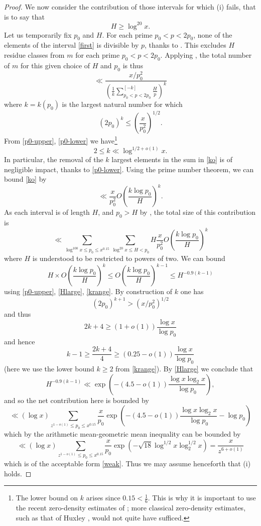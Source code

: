 \documentclass[12pt]{amsart}
\begin{document}
\begin{proof}
We now consider the contribution of those intervals for which (i) fails, that is to say that
\begin{equation}\label{Hlarge}
    H \geq \log^{20} x.
\end{equation}
Let us temporarily fix $p_0$ and $H$.  For each prime $p_0 < p < 2p_0$, none of the elements of the interval \eqref{first} is divisible by $p$, thanks to .  This excludes $H$ residue classes from $m$ for each prime $p_0 < p < 2p_0$.
Applying , the total number of $m$ for this given choice of $H$ and $p_0$ is thus
\begin{equation}\label{ko}
 \ll \frac{x/p_0^2}{\left( \frac{1}{k} \sum_{p_0 < p < 2p_0}^{[-k]}\frac{H}{p} \right)^k}
\end{equation}
where $k = k(p_0)$ is the largest natural number for which
$$ (2p_0)^k \leq \left(\frac{x}{p_0^2}\right)^{1/2}.$$
From \eqref{p0-upper}, \eqref{p0-lower} we have\footnote{The lower bound on $k$ arises since $0.15 < \frac{1}{6}$.  This is why it is important to use the recent zero-density estimates of \cite{guth-maynard}; more classical zero-density estimates, such as that of Huxley \cite{huxley}, would not quite have sufficed.}
\begin{equation}\label{krange}
2 \leq k \ll \log^{1/2+o(1)} x.
\end{equation}
In particular, the removal of the $k$ largest elements in the sum in \eqref{ko} is of negligible impact, thanks to \eqref{p0-lower}.
Using the prime number theorem, we can bound \eqref{ko} by
$$ \ll \frac{x}{p_0^2} O\left( \frac{k \log p_0}{H} \right)^k.$$
As each interval is of length $H$, and $p_0 > H$ by , the total size of this contribution is
$$ \ll \sum_{\log^{100} x \leq p_0 \leq x^{0.15}} \sum_{\log^{20} x \leq H < p_0} H \frac{x}{p_0^2} O\left( \frac{k \log p_0}{H} \right)^k$$
where $H$ is understood to be restricted to powers of two.  We can bound
$$ H \times O\left( \frac{k \log p_0}{H} \right)^k \leq O\left( \frac{k \log p_0}{H} \right)^{k-1} \leq H^{-0.9 (k-1)}$$
using \eqref{p0-upper}, \eqref{Hlarge}, \eqref{krange}.  By construction of $k$ one has
$$ (2p_0)^{k+1} > (x/p_0^2)^{1/2}$$
and thus
$$ 2k+4 \geq (1+o(1)) \frac{\log x}{\log p_0}$$
and hence
$$ k-1 \geq \frac{2k+4}{4} \geq (0.25-o(1)) \frac{\log x}{\log p_0}$$
(here we use the lower bound $k \geq 2$ from \eqref{krange}).
By \eqref{Hlarge} we conclude that
$$ H^{-0.9 (k-1)} \ll \exp\left( - (4.5-o(1)) \frac{\log x \log_2 x}{\log p_0} \right),$$
and so the net contribution here is bounded by
$$ \ll (\log x) \sum_{z^{1-o(1)} \leq p_0 \leq x^{0.15}} \frac{x}{p_0}
\exp\left( - (4.5-o(1)) \frac{\log x \log_2 x}{\log p_0} - \log p_0 \right)$$
which by the arithmetic mean-geometric mean inequality can be bounded by
$$ \ll (\log x) \sum_{z^{1-o(1)} \leq p_0 \leq x^{0.15}} \frac{x}{p_0}
\exp( - \sqrt{18} \log^{1/2} x \log^{1/2}_2 x ) = \frac{x}{z^{6+o(1)}}$$
which is of the acceptable form \eqref{weak}.
Thus we may assume henceforth that (i) holds.


\end{proof}
\end{document}
